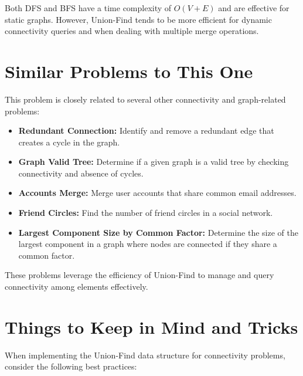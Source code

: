 Both DFS and BFS have a time complexity of \(O(V + E)\) and are effective for static graphs. However, Union-Find tends to be more efficient for dynamic connectivity queries and when dealing with multiple merge operations.

\section*{Similar Problems to This One}

This problem is closely related to several other connectivity and graph-related problems:

\begin{itemize}
    \item \textbf{Redundant Connection:}  
    Identify and remove a redundant edge that creates a cycle in the graph.
    
    \item \textbf{Graph Valid Tree:}  
    Determine if a given graph is a valid tree by checking connectivity and absence of cycles.
    
    \item \textbf{Accounts Merge:}  
    Merge user accounts that share common email addresses.
    
    \item \textbf{Friend Circles:}  
    Find the number of friend circles in a social network.
    
    \item \textbf{Largest Component Size by Common Factor:}  
    Determine the size of the largest component in a graph where nodes are connected if they share a common factor.
\end{itemize}

These problems leverage the efficiency of Union-Find to manage and query connectivity among elements effectively.

\section*{Things to Keep in Mind and Tricks}

When implementing the Union-Find data structure for connectivity problems, consider the following best practices:

